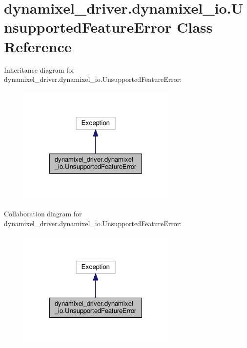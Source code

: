 \hypertarget{classdynamixel__driver_1_1dynamixel__io_1_1_unsupported_feature_error}{}\section{dynamixel\+\_\+driver.\+dynamixel\+\_\+io.\+Unsupported\+Feature\+Error Class Reference}
\label{classdynamixel__driver_1_1dynamixel__io_1_1_unsupported_feature_error}


Inheritance diagram for dynamixel\+\_\+driver.\+dynamixel\+\_\+io.\+Unsupported\+Feature\+Error\+:
\nopagebreak
\begin{figure}[H]
\begin{center}
\leavevmode
\includegraphics[width=222pt]{d7/d00/classdynamixel__driver_1_1dynamixel__io_1_1_unsupported_feature_error__inherit__graph}
\end{center}
\end{figure}


Collaboration diagram for dynamixel\+\_\+driver.\+dynamixel\+\_\+io.\+Unsupported\+Feature\+Error\+:
\nopagebreak
\begin{figure}[H]
\begin{center}
\leavevmode
\includegraphics[width=222pt]{d6/dc1/classdynamixel__driver_1_1dynamixel__io_1_1_unsupported_feature_error__coll__graph}
\end{center}
\end{figure}
